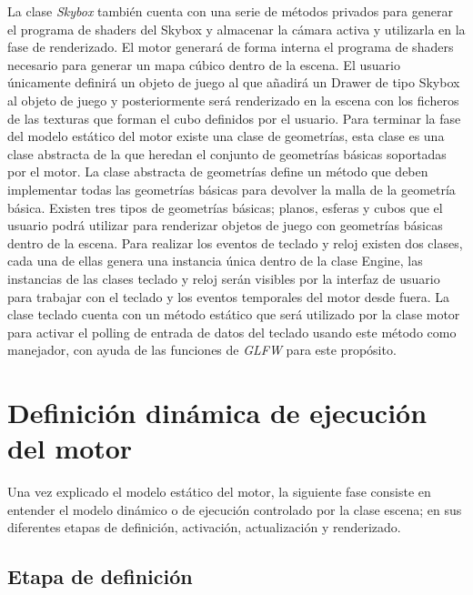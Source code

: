 \documentclass[a4paper]{book}
\begin{document}
La clase \textit{Skybox} también cuenta con una serie de métodos privados para generar el programa de shaders del Skybox y almacenar la cámara
activa y utilizarla en la fase de renderizado. El motor generará de forma interna el programa de shaders necesario para generar un mapa
cúbico dentro de la escena. El usuario únicamente definirá un objeto de juego al que añadirá un Drawer de tipo Skybox al objeto de juego y
posteriormente será renderizado en la escena con los ficheros de las texturas que forman el cubo definidos por el usuario. Para terminar la
fase del modelo estático del motor existe una clase de geometrías, esta clase es una clase abstracta de la que heredan el
conjunto de geometrías básicas soportadas por el motor. La clase abstracta de geometrías define un método que deben implementar todas las
geometrías básicas para devolver la malla de la geometría básica. Existen tres tipos de geometrías básicas; planos, esferas y cubos que el
usuario podrá utilizar para renderizar objetos de juego con geometrías básicas dentro de la escena. Para realizar los eventos de teclado y reloj
existen dos clases, cada una de ellas genera una instancia única dentro de la clase Engine, las instancias de las clases teclado y reloj serán
visibles por la interfaz de usuario para trabajar con el teclado y los eventos temporales del motor desde fuera. La clase teclado cuenta con un método
estático que será utilizado por la clase motor para activar el polling de entrada de datos del teclado usando este método como manejador,
con ayuda de las funciones de \textit{GLFW} para este propósito.

\section{Definición dinámica de ejecución del motor}
\label{sec:Dinamica}

Una vez explicado el modelo estático del motor, la siguiente fase consiste en entender el modelo dinámico o de ejecución controlado por la
clase escena; en sus diferentes etapas de definición, activación, actualización y renderizado.

\subsection{Etapa de definición}
\label{subsec:definicion}
\end{document}
